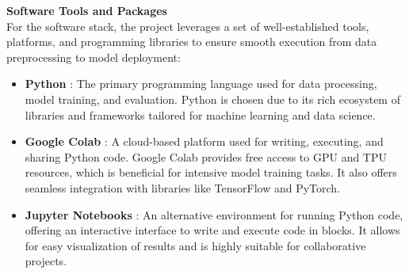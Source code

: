 \noindent
\textbf{Software Tools and Packages} \\
\noindent
For the software stack, the project leverages a set of well-established tools, platforms, and programming libraries to ensure smooth execution from data preprocessing to model deployment:
\begin{itemize}
    \item \textbf{Python} :
    \noindent
    The primary programming language used for data processing, model training, and evaluation. Python is chosen due to its rich ecosystem of libraries and frameworks tailored for machine learning and data science.
    \item \textbf{Google Colab} :
    \noindent
    A cloud-based platform used for writing, executing, and sharing Python code. Google Colab provides free access to GPU and TPU resources, which is beneficial for intensive model training tasks. It also offers seamless integration with libraries like TensorFlow and PyTorch.
    \item \textbf{Jupyter Notebooks} :
    \noindent
     An alternative environment for running Python code, offering an interactive interface to write and execute code in blocks. It allows for easy visualization of results and is highly suitable for collaborative projects.
\end{itemize}

\pagebreak

